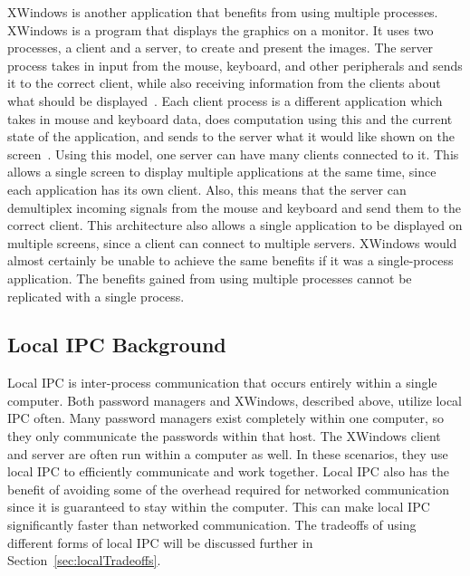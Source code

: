 XWindows is another application that benefits from using multiple processes.  XWindows is a program that displays the graphics on a monitor.  It uses two processes, a client and a server, to create and present the images.  The server process takes in input from the mouse, keyboard, and other peripherals and sends it to the correct client, while also receiving information from the clients about what should be displayed~\cite{Scheifler:1986:XWS:22949.24053}.  Each client process is a different application which takes in mouse and keyboard data, does computation using this and the current state of the application, and sends to the server what it would like shown on the screen~\cite{Scheifler:1986:XWS:22949.24053}.  Using this model, one server can have many clients connected to it.  This allows a single screen to display multiple applications at the same time, since each application has its own client.  Also, this means that the server can demultiplex incoming signals from the mouse and keyboard and send them to the correct client.  This architecture also allows a single application to be displayed on multiple screens, since a client can connect to multiple servers.  XWindows would almost certainly be unable to achieve the same benefits if it was a single-process application.  The benefits gained from using multiple processes cannot be replicated with a single process.

\subsection{Local IPC Background}
Local IPC is inter-process communication that occurs entirely within a single computer.  Both password managers and XWindows, described above, utilize local IPC often.  Many password managers exist completely within one computer, so they only communicate the passwords within that host.  The XWindows client and server are often run within a computer as well.  In these scenarios, they use local IPC to efficiently communicate and work together.  Local IPC also has the benefit of avoiding some of the overhead required for networked communication since it is guaranteed to stay within the computer.  This can make local IPC significantly faster than networked communication.  The tradeoffs of using different forms of local IPC will be discussed further in Section~\ref{sec:localTradeoffs}.

